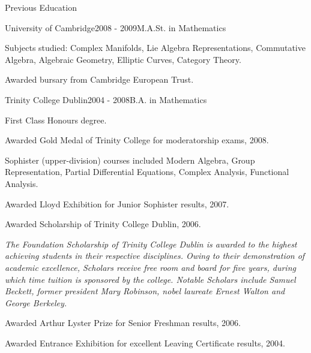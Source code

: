 \documentclass{resume} %
\begin{document}
\begin{rSection}{Previous Education}
\begin{rSubsection}{University of Cambridge}{2008 - 2009}{M.A.St. in Mathematics}{}
\item Subjects studied: Complex Manifolds, Lie Algebra Representations, Commutative Algebra, Algebraic Geometry, Elliptic Curves, Category Theory.
\item Awarded bursary from Cambridge European Trust.
\end{rSubsection}

\begin{rSubsection}{Trinity College Dublin}{2004 - 2008}{B.A. in Mathematics}{}
\item First Class Honours degree.
\item Awarded Gold Medal of Trinity College for moderatorship exams, 2008.
\item Sophister (upper-division) courses included Modern Algebra, Group Representation, Partial Differential Equations, Complex Analysis, Functional Analysis.
\item Awarded Lloyd Exhibition for Junior Sophister results, 2007.
\item Awarded Scholarship of Trinity College Dublin, 2006.

\emph{The Foundation Scholarship of Trinity College Dublin is awarded to the highest achieving students in their respective disciplines. Owing to their demonstration of academic excellence, Scholars receive free room and board for five years, during which time tuition is sponsored by the college. Notable Scholars include Samuel Beckett, former president Mary Robinson, nobel laureate Ernest Walton and George Berkeley.}
\bigskip
\item Awarded Arthur Lyster Prize for Senior Freshman results, 2006.
\item Awarded Entrance Exhibition for excellent Leaving Certificate results, 2004.
\end{rSubsection}
\end{rSection}

\end{document}
